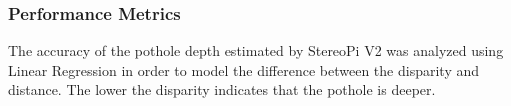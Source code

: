 \subsubsection{Performance Metrics}
The accuracy of the pothole depth estimated by StereoPi V2 was analyzed using Linear Regression in order to model the difference between the disparity and distance. The lower the disparity indicates that the pothole is deeper.





